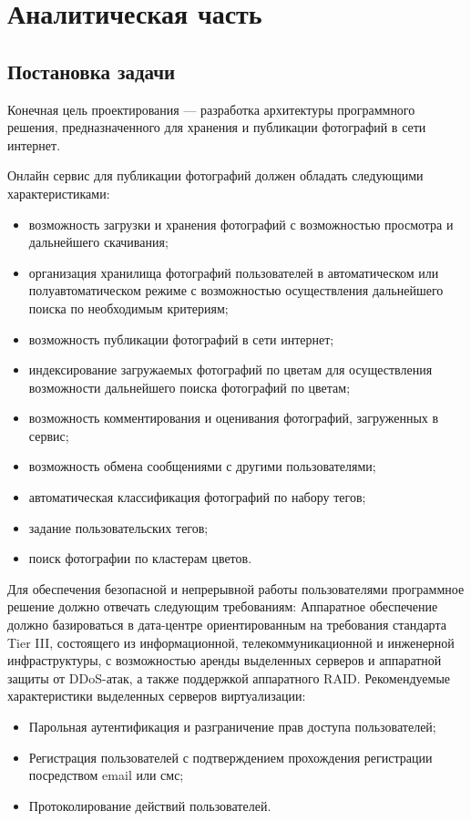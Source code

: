 \section{Аналитическая часть}\label{analytics}

\subsection{Постановка задачи}\label{problem-formulation}

Конечная цель проектирования --- разработка архитектуры программного решения, предназначенного для хранения и публикации фотографий в сети интернет.

Онлайн сервис для публикации фотографий должен обладать следующими характеристиками:
\begin{itemize}
    \item возможность загрузки и хранения фотографий с возможностью просмотра и дальнейшего скачивания;
    \item организация хранилища фотографий пользователей в автоматическом или полуавтоматическом режиме с возможностью осуществления дальнейшего поиска по необходимым критериям;
    \item возможность публикации фотографий в сети интернет;
    \item индексирование загружаемых фотографий по цветам для осуществления возможности дальнейшего поиска фотографий по цветам;
    \item возможность комментирования и оценивания фотографий, загруженных в сервис;
    \item возможность обмена сообщениями с другими пользователями;
    \item автоматическая классификация фотографий по набору тегов;
    \item задание пользовательских тегов;
    \item поиск фотографии по кластерам цветов.
\end{itemize}

Для обеспечения безопасной и непрерывной работы пользователями программное решение должно отвечать следующим требованиям:
Аппаратное обеспечение должно базироваться в дата-центре ориентированным на требования стандарта Tier III, состоящего из информационной, телекоммуникационной и инженерной инфраструктуры, с возможностью аренды выделенных серверов и аппаратной защиты от DDoS-атак, а также поддержкой аппаратного RAID.
Рекомендуемые характеристики выделенных серверов виртуализации:
\begin{itemize}
    \item Парольная аутентификация и разграничение прав доступа пользователей;
    \item Регистрация пользователей с подтверждением прохождения регистрации посредством email или смс;
    \item Протоколирование действий пользователей.
\end{itemize}

